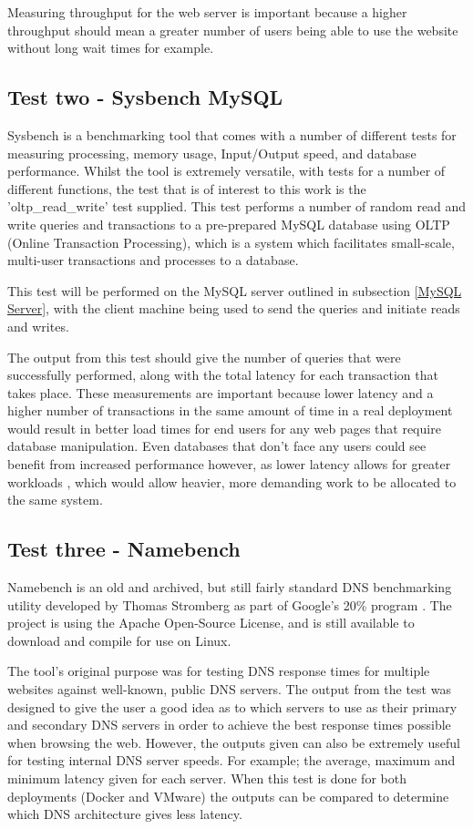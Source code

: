 Measuring throughput for the web server is important because a higher throughput should mean a greater number of users being able to use the website without long wait times for example.

\subsection{Test two - Sysbench MySQL}
Sysbench is a benchmarking tool that comes with a number of different tests for measuring processing, memory usage, Input/Output speed, and database performance\citep{sysbench}. Whilst the tool is extremely versatile, with tests for a number of different functions, the test that is of interest to this work is the 'oltp\_read\_write' test supplied. This test performs a number of random read and write queries and transactions to a pre-prepared MySQL database using OLTP (Online Transaction Processing), which is a system which facilitates small-scale, multi-user transactions and processes to a database\citep{oltpbenchmarking}.

This test will be performed on the MySQL server outlined in subsection \ref{MySQL Server}, with the client machine being used to send the queries and initiate reads and writes.

The output from this test should give the number of queries that were successfully performed, along with the total latency for each transaction that takes place. These measurements are important because lower latency and a higher number of transactions in the same amount of time in a real deployment would result in better load times for end users for any web pages that require database manipulation. Even databases that don't face any users could see benefit from increased performance however, as lower latency allows for greater workloads \citep{MySQLlatency}, which would allow heavier, more demanding work to be allocated to the same system.

\subsection{Test three - Namebench}
Namebench is an old and archived, but still fairly standard DNS benchmarking utility developed by Thomas Stromberg as part of Google's 20\% program \citep{Namebench}. The project is using the Apache Open-Source License, and is still available to download and compile for use on Linux.

The tool's original purpose was for testing DNS response times for multiple websites against well-known, public DNS servers. The output from the test was designed to give the user a good idea as to which servers to use as their primary and secondary DNS servers in order to achieve the best response times possible when browsing the web. However, the outputs given can also be extremely useful for testing internal DNS server speeds. For example; the average, maximum and minimum latency given for each server. When this test is done for both deployments (Docker and VMware) the outputs can be compared to determine which DNS architecture gives less latency.

